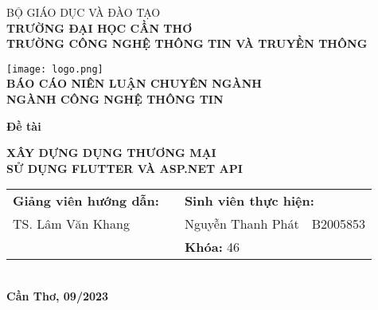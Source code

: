 
\begin{titlepage}

    \begin{center}

        BỘ GIÁO DỤC VÀ ĐÀO TẠO\\
        \textbf{TRƯỜNG ĐẠI HỌC CẦN THƠ\\}
        \textbf{TRƯỜNG CÔNG NGHỆ THÔNG TIN VÀ TRUYỀN THÔNG\\[1cm]}

        \texttt{[image: logo.png]}\\[1cm]

        \textbf{BÁO CÁO NIÊN LUẬN CHUYÊN NGÀNH\\}
        \textbf{NGÀNH CÔNG NGHỆ THÔNG TIN\\[2cm]}

        \begin{large}
            \textbf{Đề tài\\[0.5cm]}
        \end{large}
        \textbf{{\LARGE XÂY DỰNG DỤNG THƯƠNG MẠI \\ SỬ DỤNG FLUTTER VÀ ASP.NET API}}
        \\[3.5cm]

        \begin{tabular}{ l c l l }
            \textbf{Giảng viên hướng dẫn:} & \hspace{2cm} & \multicolumn{2}{l}{\textbf{Sinh viên thực hiện:}}   \\
            TS. Lâm Văn Khang              &              & Nguyễn Thanh Phát                                 &
            B2005853                                                                                            \\
                                           &              & \multicolumn{2}{l}{\textbf{Khóa:} 46}
        \end{tabular}
        \\[4cm]

        \textbf{Cần Thơ, 09/2023}

    \end{center}

\end{titlepage}